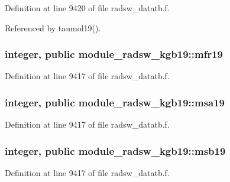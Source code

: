 Definition at line 9420 of file radsw\+\_\+datatb.\+f.



Referenced by taumol19().

\subsubsection[{\texorpdfstring{mfr19}{mfr19}}]{\setlength{\rightskip}{0pt plus 5cm}integer, public module\+\_\+radsw\+\_\+kgb19\+::mfr19}\hypertarget{namespacemodule__radsw__kgb19_a57f837ef4316dc2441bca3fde3998156}{}\label{namespacemodule__radsw__kgb19_a57f837ef4316dc2441bca3fde3998156}


Definition at line 9417 of file radsw\+\_\+datatb.\+f.

\subsubsection[{\texorpdfstring{msa19}{msa19}}]{\setlength{\rightskip}{0pt plus 5cm}integer, public module\+\_\+radsw\+\_\+kgb19\+::msa19}\hypertarget{namespacemodule__radsw__kgb19_a498993cce64baa8f22c8dfdce632cf85}{}\label{namespacemodule__radsw__kgb19_a498993cce64baa8f22c8dfdce632cf85}


Definition at line 9417 of file radsw\+\_\+datatb.\+f.

\subsubsection[{\texorpdfstring{msb19}{msb19}}]{\setlength{\rightskip}{0pt plus 5cm}integer, public module\+\_\+radsw\+\_\+kgb19\+::msb19}\hypertarget{namespacemodule__radsw__kgb19_a42771fcf9dd17b5c9d0d03cb2bf1c923}{}\label{namespacemodule__radsw__kgb19_a42771fcf9dd17b5c9d0d03cb2bf1c923}


Definition at line 9417 of file radsw\+\_\+datatb.\+f.

